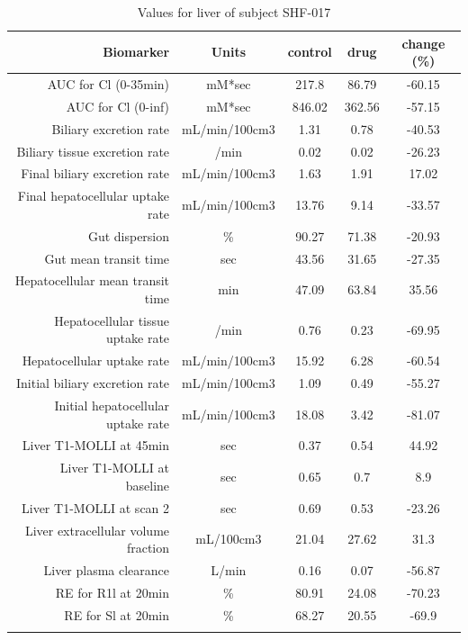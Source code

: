 \documentclass{epflreport}%
\begin{document}
%
\clearpage%
\begin{longtable}{rcccc}%
\hline%
Biomarker&Units&control&drug&change (\%)\\%
\hline%
AUC for Cl (0{-}35min)&mM*sec&217.8&86.79&{-}60.15\\%
AUC for Cl (0{-}inf)&mM*sec&846.02&362.56&{-}57.15\\%
Biliary excretion rate&mL/min/100cm3&1.31&0.78&{-}40.53\\%
Biliary tissue excretion rate&/min&0.02&0.02&{-}26.23\\%
Final biliary excretion rate&mL/min/100cm3&1.63&1.91&17.02\\%
Final hepatocellular uptake rate&mL/min/100cm3&13.76&9.14&{-}33.57\\%
Gut dispersion&\%&90.27&71.38&{-}20.93\\%
Gut mean transit time&sec&43.56&31.65&{-}27.35\\%
Hepatocellular mean transit time&min&47.09&63.84&35.56\\%
Hepatocellular tissue uptake rate&/min&0.76&0.23&{-}69.95\\%
Hepatocellular uptake rate&mL/min/100cm3&15.92&6.28&{-}60.54\\%
Initial biliary excretion rate&mL/min/100cm3&1.09&0.49&{-}55.27\\%
Initial hepatocellular uptake rate&mL/min/100cm3&18.08&3.42&{-}81.07\\%
Liver T1{-}MOLLI at 45min&sec&0.37&0.54&44.92\\%
Liver T1{-}MOLLI at baseline&sec&0.65&0.7&8.9\\%
Liver T1{-}MOLLI at scan 2&sec&0.69&0.53&{-}23.26\\%
Liver extracellular volume fraction&mL/100cm3&21.04&27.62&31.3\\%
Liver plasma clearance&L/min&0.16&0.07&{-}56.87\\%
RE for R1l at 20min&\%&80.91&24.08&{-}70.23\\%
RE for Sl at 20min&\%&68.27&20.55&{-}69.9\\%
\hline%
\caption{Values for liver of subject SHF-017} \\%
\end{longtable}%
\end{document}
